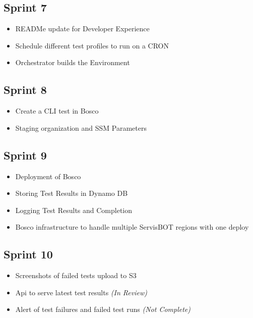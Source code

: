 \documentclass[12pt,a4paper,titlepage]{report}
\begin{document}
\subsection*{Sprint 7}
\begin{itemize}
\item READMe update for Developer Experience
\item Schedule different test profiles to run on a CRON
\item Orchestrator builds the Environment
\end{itemize}

\subsection*{Sprint 8}
\begin{itemize}
\item Create a CLI test in Bosco
\item Staging organization and SSM Parameters
\end{itemize}

\subsection*{Sprint 9}
\begin{itemize}
\item Deployment of Bosco
\item Storing Test Results in Dynamo DB
\item Logging Test Results and Completion
\item Bosco infrastructure to handle multiple ServisBOT regions with one deploy
\end{itemize}

\subsection*{Sprint 10}
\begin{itemize}
\item Screenshots of failed tests upload to S3
\item Api to serve latest test results \textit{(In Review)}
\item Alert of test failures and failed test runs \textit{(Not Complete)}
\end{itemize}
\end{document}

